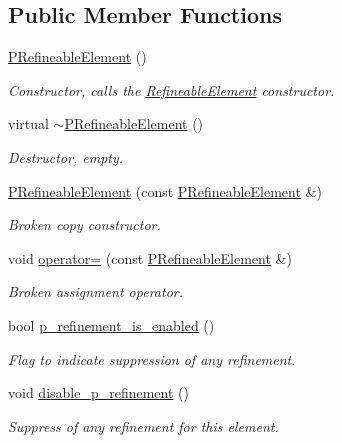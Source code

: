 \subsection*{Public Member Functions}
\begin{DoxyCompactItemize}
\item 
\hyperlink{classoomph_1_1PRefineableElement_aeaac46015434fba4a9de7dc33073ff86}{P\+Refineable\+Element} ()
\begin{DoxyCompactList}\small\item\em Constructor, calls the \hyperlink{classoomph_1_1RefineableElement}{Refineable\+Element} constructor. \end{DoxyCompactList}\item 
virtual \hyperlink{classoomph_1_1PRefineableElement_a5b96194fe6780017d5b2b768658bea48}{$\sim$\+P\+Refineable\+Element} ()
\begin{DoxyCompactList}\small\item\em Destructor, empty. \end{DoxyCompactList}\item 
\hyperlink{classoomph_1_1PRefineableElement_a1b2654f84c198969760b453d7bba765b}{P\+Refineable\+Element} (const \hyperlink{classoomph_1_1PRefineableElement}{P\+Refineable\+Element} \&)
\begin{DoxyCompactList}\small\item\em Broken copy constructor. \end{DoxyCompactList}\item 
void \hyperlink{classoomph_1_1PRefineableElement_a5646a9676ea05f91ca6f6005ee5104c8}{operator=} (const \hyperlink{classoomph_1_1PRefineableElement}{P\+Refineable\+Element} \&)
\begin{DoxyCompactList}\small\item\em Broken assignment operator. \end{DoxyCompactList}\item 
bool \hyperlink{classoomph_1_1PRefineableElement_a086636c6717bb5bbe7e31123bc0cd511}{p\+\_\+refinement\+\_\+is\+\_\+enabled} ()
\begin{DoxyCompactList}\small\item\em Flag to indicate suppression of any refinement. \end{DoxyCompactList}\item 
void \hyperlink{classoomph_1_1PRefineableElement_a7947f3fe08f0545cdffb3a6b773d4cf5}{disable\+\_\+p\+\_\+refinement} ()
\begin{DoxyCompactList}\small\item\em Suppress of any refinement for this element. \end{DoxyCompactList}\item 

\end{DoxyCompactItemize}

